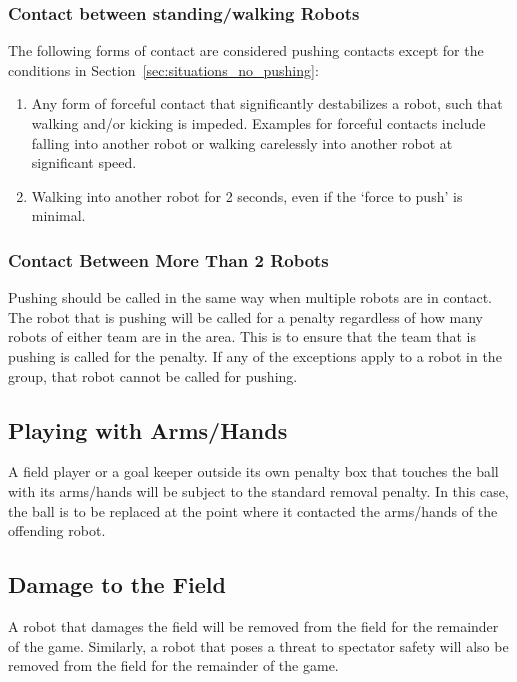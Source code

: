\documentclass[12pt]{article}
\begin{document}
\subsubsection{Contact between standing/walking Robots}
\label{sec:pushing_contact}

The following forms of contact are considered pushing contacts except for the conditions in Section~\ref{sec:situations_no_pushing}:
\begin{enumerate}
	\item Any form of forceful contact that significantly destabilizes a robot, such that walking and/or kicking is impeded. Examples for forceful contacts include falling into another robot or walking carelessly into another robot at significant speed.
	\item Walking into another robot for 2 seconds, even if the `force to push' is minimal.
\end{enumerate}

\subsubsection{Contact Between More Than 2 Robots}
\label{sec:pushing_several_robots}

Pushing should be called in the same way when multiple robots are in contact. The robot that is pushing will be called for a penalty regardless of how many robots of either team are in the area. This is to ensure that the team that is pushing is called for the penalty. If any of the exceptions apply to a robot in the group, that robot cannot be called for pushing.

\subsection{Playing with Arms/Hands}
\label{sec:hand_ball}

A field player or a goal keeper outside its own penalty box that touches the ball with its arms/hands will be subject to the standard removal penalty. In this case, the ball is to be replaced at the point where it contacted the arms/hands of the offending robot.

\subsection{Damage to the Field}
\label{sec:damage}
A robot that damages the field will be removed from the field for the remainder of the game. Similarly, a robot that poses a threat to spectator safety will also be removed from the field for the remainder of the game.
\end{document}
